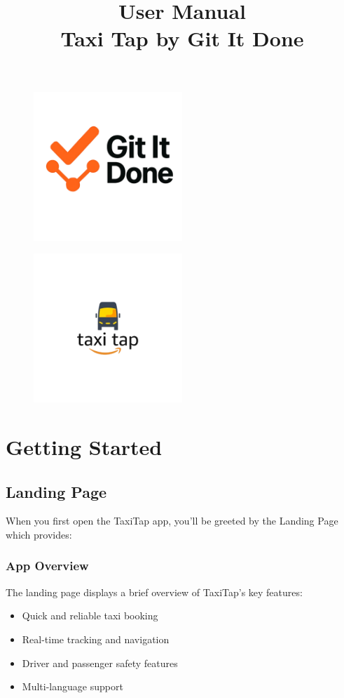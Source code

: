 \documentclass[12pt]{article}
\title{User Manual\\Taxi Tap by Git It Done}
\date{}
\begin{document}
\maketitle
\begin{figure}[H]
  \centering
  \includegraphics[width=0.5\textwidth]{LogoGroup.png} 
\end{figure}
\begin{figure}[H]
  \centering
  \includegraphics[width=0.5\textwidth]{LogoTaxiTap.png} 
\end{figure}
\newpage
\tableofcontents
\newpage

\section{Getting Started}

\subsection{Landing Page}

When you first open the TaxiTap app, you'll be greeted by the Landing Page which provides:

\subsubsection{App Overview}
The landing page displays a brief overview of TaxiTap's key features:
\begin{itemize}
    \item Quick and reliable taxi booking
    \item Real-time tracking and navigation
    \item Driver and passenger safety features
    \item Multi-language support
\end{itemize}
\end{document}
